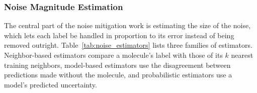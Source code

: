 \subsubsection{Noise Magnitude Estimation}

The central part of the noise mitigation work is estimating the size of the noise, which lets each label be handled in proportion to its error instead of being removed outright. Table~\ref{tab:noise_estimators} lists three families of estimators. Neighbor-based estimators compare a molecule's label with those of its $k$ nearest training neighbors, model-based estimators use the disagreement between predictions made without the molecule, and probabilistic estimators use a model's predicted uncertainty.

